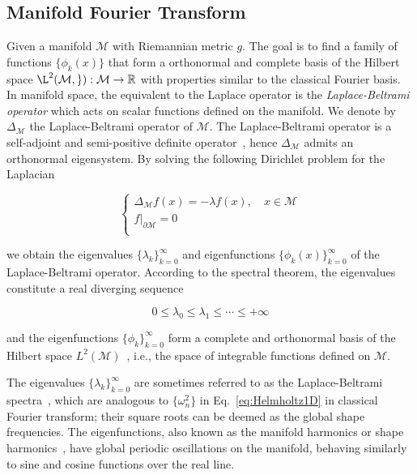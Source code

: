 \subsection{Manifold Fourier Transform}
Given a manifold $\mathcal{M}$ with Riemannian metric $g$. The goal is to find a family
of functions $\{\phi_k(x)\}$ that form a orthonormal and complete
basis of the Hilbert space $\L^2(\mathcal{M,g}):\mathcal{M}\to\mathbb{R}$ with
properties similar to the classical Fourier basis. In manifold space, the equivalent
to the Laplace operator is the \emph{Laplace-Beltrami operator} which acts on
scalar functions defined on the manifold. We denote by $\Delta_\mathcal{M}$ the
Laplace-Beltrami operator of $\mathcal{M}$. The Laplace-Beltrami operator is a self-adjoint
and semi-positive definite operator~\cite{Rosenberg:1997}, hence $\Delta_\mathcal{M}$ admits
an orthonormal eigensystem. By solving the following Dirichlet problem for the Laplacian

\begin{equation}
\left\{
    \begin{array}{l}
        \Delta_\mathcal{M}f(x)=-\lambda f(x),\quad x\in\mathcal{M}\\
        f|_{\partial\mathcal{M}}=0\\
    \end{array}
\right.
\end{equation}

we obtain the eigenvalues $\{\lambda_k\}_{k=0}^\infty$ and eigenfunctions $\{\phi_k(x)\}_{k=0}^\infty$
of the Laplace-Beltrami operator. According to the spectral theorem, the eigenvalues constitute a real
diverging sequence

\begin{equation*}
0\leq\lambda_0\leq\lambda_1\leq\cdots\leq +\infty
\end{equation*}

and the eigenfunctions $\{\phi_k\}_{k=0}^\infty$ form a complete and orthonormal basis of the Hilbert
space $L^2(\mathcal{M})$~\cite{Levy2006}, i.e., the space of integrable functions defined on $\mathcal{M}$.

The eigenvalues $\{\lambda_k\}_{k=0}^\infty$ are sometimes referred to as the Laplace-Beltrami
spectra~\cite{Reuter:2006:CAD}, which are analogous to $\{\omega_n^2\}$ in Eq.~\ref{eq:Helmholtz1D}
in classical Fourier transform; their square roots can be deemed as the global shape frequencies.
The eigenfunctions, also known as the manifold harmonics or shape harmonics~\cite{Vallet2008},
have global periodic oscillations on the manifold, behaving similarly to sine and cosine
functions over the real line.

